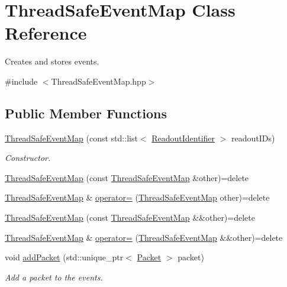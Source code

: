 \hypertarget{class_thread_safe_event_map}{}\section{Thread\+Safe\+Event\+Map Class Reference}
\label{class_thread_safe_event_map}


Creates and stores events.  




{\ttfamily \#include $<$Thread\+Safe\+Event\+Map.\+hpp$>$}

\subsection*{Public Member Functions}
\begin{DoxyCompactItemize}
\item 
\hyperlink{class_thread_safe_event_map_a766a347019971b1697e7e223290364b4}{Thread\+Safe\+Event\+Map} (const std\+::list$<$ \hyperlink{class_readout_identifier}{Readout\+Identifier} $>$ readout\+I\+Ds)
\begin{DoxyCompactList}\small\item\em Constructor. \end{DoxyCompactList}\item 
\hyperlink{class_thread_safe_event_map_a523d5bf6c632e3803e721ef3fd94e318}{Thread\+Safe\+Event\+Map} (const \hyperlink{class_thread_safe_event_map}{Thread\+Safe\+Event\+Map} \&other)=delete
\item 
\hyperlink{class_thread_safe_event_map}{Thread\+Safe\+Event\+Map} \& \hyperlink{class_thread_safe_event_map_a1d438208fcc3936dd4384a8a2b55bdf8}{operator=} (\hyperlink{class_thread_safe_event_map}{Thread\+Safe\+Event\+Map} other)=delete
\item 
\hyperlink{class_thread_safe_event_map_af28959f5fbd84f00d227d10e1b37e5e5}{Thread\+Safe\+Event\+Map} (const \hyperlink{class_thread_safe_event_map}{Thread\+Safe\+Event\+Map} \&\&other)=delete
\item 
\hyperlink{class_thread_safe_event_map}{Thread\+Safe\+Event\+Map} \& \hyperlink{class_thread_safe_event_map_a6bf7640fde19d7d6d4dedd5b06c09f84}{operator=} (\hyperlink{class_thread_safe_event_map}{Thread\+Safe\+Event\+Map} \&\&other)=delete
\item 
void \hyperlink{class_thread_safe_event_map_aafd485696f0a50da8afa864f04f0aa07}{add\+Packet} (std\+::unique\+\_\+ptr$<$ \hyperlink{class_packet}{Packet} $>$ packet)
\begin{DoxyCompactList}\small\item\em Add a packet to the events. \end{DoxyCompactList}\item 

\end{DoxyCompactItemize}
